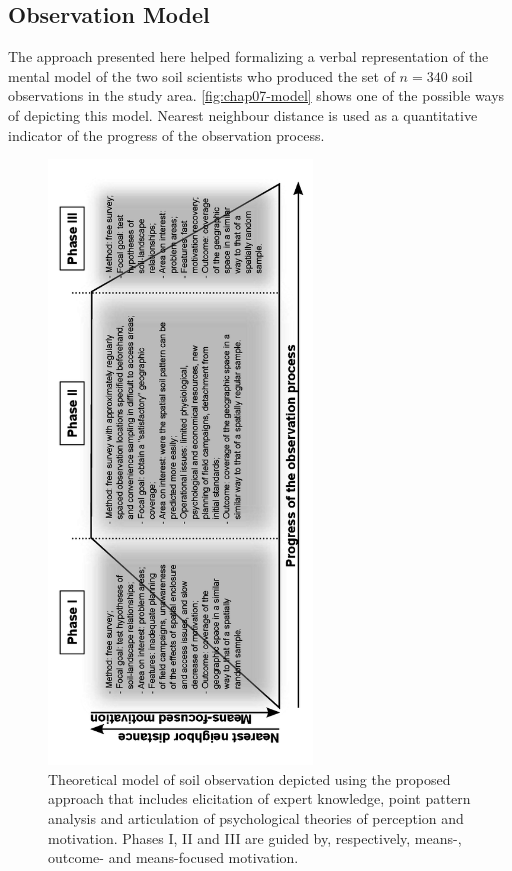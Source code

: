 \subsection{Observation Model}

The approach presented here helped formalizing a verbal representation of the mental model of the two soil 
scientists who produced the set of $n = 340$ soil observations in the study area. \autoref{fig:chap07-model} 
shows one of the possible ways of depicting this model. Nearest neighbour distance is 
used as a quantitative indicator of the progress of the observation process.

\begin{figure}[!h]
\centering
\includegraphics[width=70mm, angle=-90]{fig/chap07-observation-model}
 \caption[Theoretical model of soil observation.]{Theoretical model of soil observation depicted using the 
proposed approach that includes elicitation of expert knowledge, point pattern analysis and articulation of 
psychological theories of perception and 
 motivation. Phases I, II and III are guided by, respectively, means-, outcome- and means-focused motivation.}
 \label{fig:chap07-model}
\end{figure}

